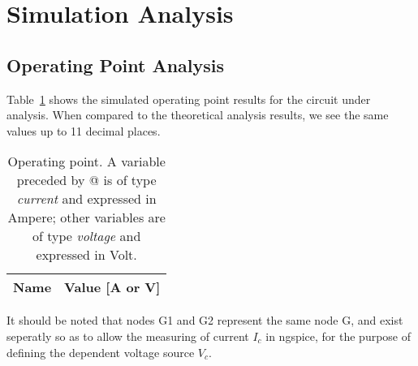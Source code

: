 \section{Simulation Analysis}
\label{sec:simulation}

\subsection{Operating Point Analysis}

Table~\ref{tab:op} shows the simulated operating point results for the circuit
under analysis. When compared to the theoretical analysis results, we see the same values
up to 11 decimal places.

\begin{table}[h]
  \centering
  \begin{tabular}{|l|r|}
    \hline    
    {\bf Name} & {\bf Value [A or V]} \\ \hline
    
  \end{tabular}
  \caption{Operating point. A variable preceded by @ is of type {\em current}
    and expressed in Ampere; other variables are of type {\it voltage} and expressed in
    Volt.}
  \label{tab:op}
\end{table}

It should be noted that nodes G1 and G2 represent the same node G, and exist seperatly
so as to allow the measuring of current $I_c$ in ngspice, for the purpose of defining the
dependent voltage source $V_c$.

